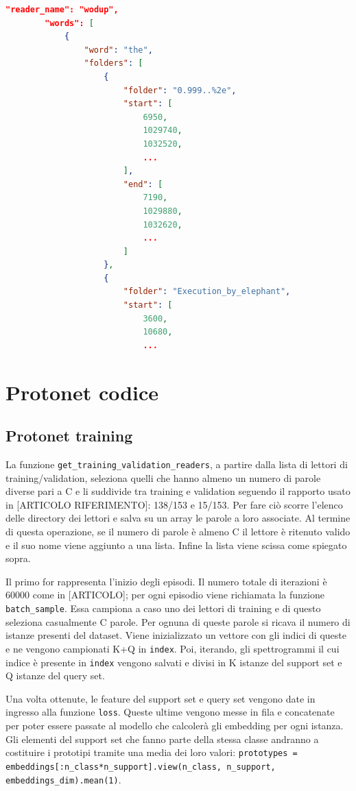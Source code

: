 \documentclass[12pt,a4paper,titlepage]{article}
\begin{document}
\begin{lstlisting}[language=iPython,firstnumber=1, caption=words\_per\_reader.py, label=words_per_reader,captionpos=b]
\end{lstlisting}
	
\begin{lstlisting}[language=json,firstnumber=1, caption=Formato del file readers\_words.json, label=readers_words,captionpos=b]
"reader_name": "wodup",
		"words": [
			{
				"word": "the",
				"folders": [
					{
						"folder": "0.999..%2e",
						"start": [
							6950,
							1029740,
							1032520,
							...
						],
						"end": [
							7190,
							1029880,
							1032620,
							...
						]
					},
					{
						"folder": "Execution_by_elephant",
						"start": [
							3600,
							10680,
							...
\end{lstlisting}



\section{Protonet codice}
\subsection{Protonet training}
La funzione \texttt{get\_training\_validation\_readers}, a partire dalla lista di lettori di training/validation, seleziona quelli che hanno almeno un numero di parole diverse pari a C e li suddivide tra training e validation seguendo il rapporto usato in [ARTICOLO RIFERIMENTO]: 138/153 e 15/153.
Per fare ciò scorre l'elenco delle directory dei lettori e salva su un array le parole a loro associate. Al termine di questa operazione, se il numero di parole è almeno C il lettore è ritenuto valido e il suo nome viene aggiunto a una lista. Infine la lista viene scissa come spiegato sopra.


Il primo for rappresenta l'inizio degli episodi.
Il numero totale di iterazioni è 60000 come in [ARTICOLO]; per ogni episodio viene richiamata la funzione \texttt{batch\_sample}.
Essa campiona a caso uno dei lettori di training e di questo seleziona casualmente C parole.
Per ognuna di queste parole si ricava il numero di istanze presenti del dataset.
Viene inizializzato un vettore con gli indici di queste e ne vengono campionati K+Q in \texttt{index}. Poi, iterando, gli spettrogrammi il cui indice è presente in \texttt{index} vengono salvati e divisi in K istanze del support set e Q istanze del query set.


Una volta ottenute, le feature del support set e query set vengono date in ingresso alla funzione \texttt{loss}.
Queste ultime vengono messe in fila e concatenate per poter essere passate al modello che calcolerà gli embedding per ogni istanza.
Gli elementi del support set che fanno parte della stessa classe andranno a costituire i prototipi tramite una media dei loro valori: \texttt{prototypes = embeddings[:n\_class*n\_support].view(n\_class, n\_support, embeddings\_dim).mean(1)}.
\end{document}
